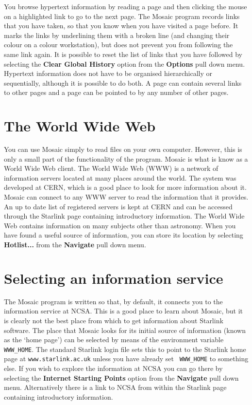 You browse hypertext information by reading a page and then clicking the mouse
on a highlighted link to go to the next page. The Mosaic program records links
that you have taken, so that you know when you have visited a page before. It
marks the links by underlining them with a broken line (and changing their
colour on a colour workstation), but does not prevent you from following the
same link again. It is possible to reset the list of links that you have
followed by selecting the {\bf Clear Global History} option from the {\bf
Options} pull down menu. Hypertext information does not have to be organised
hierarchically or sequentially, although it is possible to do both. A page can
contain several links to other pages and a page can be pointed to by any number
of other pages.


\section{The World Wide Web}

You can use Mosaic simply to read files on your own computer. However, this is
only a small part of the functionality of the program. Mosaic is what is know
as a World Wide Web client. The World Wide Web (WWW) is a network of
information servers located at many places around the world. The system was
developed at CERN, which is a good place to look for more information about it.
Mosaic can connect to any WWW server to read the information that it provides.
An up to date list of registered servers is kept at CERN and can be accessed
through the Starlink page containing introductory information. The World Wide
Web contains information on many subjects other than astronomy. When you have
found a useful source of information, you can store its location by selecting
{\bf Hotlist...} from the {\bf Navigate} pull down menu.

\section{Selecting an information service}
\label{service}

The Mosaic program is written so that, by default, it connects you to the
information service at NCSA. This is a good place to learn about Mosaic, but it
is clearly not the best place from which to get information about Starlink
software. The place that Mosaic looks for its initial source of information
(known as the `home page') can be selected by means of the environment variable
{\tt WWW\_HOME}. The standard Starlink login file sets this to point to the
Starlink home page at {\tt www.starlink.ac.uk} unless you have already set {\tt
WWW\_HOME} to something else. If you wish to explore the information at NCSA
you can go there by selecting the {\bf Internet Starting Points} option from
the {\bf Navigate} pull down menu. Alternatively there is a link to NCSA from
within the Starlink page containing introductory information.

